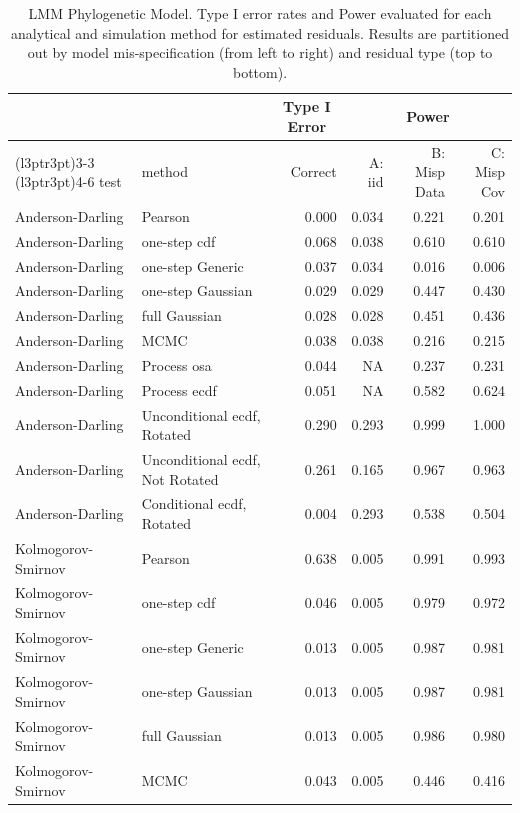 \documentclass[
]{article}
\begin{document}
\begin{table}[H]
\centering
\caption{\label{tab:phylo-results-lmm-est}LMM Phylogenetic Model. Type I error rates and Power evaluated for each analytical and simulation method for estimated residuals. Results are partitioned out by model mis-specification (from left to right) and residual type (top to bottom).}
\centering
\begin{tabular}[t]{llrrrr}
\toprule
\multicolumn{1}{c}{ } & \multicolumn{1}{c}{ } & \multicolumn{1}{c}{Type I Error} & \multicolumn{3}{c}{Power} \\
\cmidrule(l{3pt}r{3pt}){3-3} \cmidrule(l{3pt}r{3pt}){4-6}
test & method & Correct & A: iid & B: Misp Data & C: Misp Cov\\
\midrule
Anderson-Darling & Pearson & 0.000 & 0.034 & 0.221 & 0.201\\
Anderson-Darling & one-step cdf & 0.068 & 0.038 & 0.610 & 0.610\\
Anderson-Darling & one-step Generic & 0.037 & 0.034 & 0.016 & 0.006\\
Anderson-Darling & one-step Gaussian & 0.029 & 0.029 & 0.447 & 0.430\\
Anderson-Darling & full Gaussian & 0.028 & 0.028 & 0.451 & 0.436\\
\addlinespace
Anderson-Darling & MCMC & 0.038 & 0.038 & 0.216 & 0.215\\
Anderson-Darling & Process osa & 0.044 & NA & 0.237 & 0.231\\
Anderson-Darling & Process ecdf & 0.051 & NA & 0.582 & 0.624\\
Anderson-Darling & Unconditional ecdf, Rotated & 0.290 & 0.293 & 0.999 & 1.000\\
Anderson-Darling & Unconditional ecdf, Not Rotated & 0.261 & 0.165 & 0.967 & 0.963\\
\addlinespace
Anderson-Darling & Conditional ecdf, Rotated & 0.004 & 0.293 & 0.538 & 0.504\\
Kolmogorov- Smirnov & Pearson & 0.638 & 0.005 & 0.991 & 0.993\\
Kolmogorov- Smirnov & one-step cdf & 0.046 & 0.005 & 0.979 & 0.972\\
Kolmogorov- Smirnov & one-step Generic & 0.013 & 0.005 & 0.987 & 0.981\\
Kolmogorov- Smirnov & one-step Gaussian & 0.013 & 0.005 & 0.987 & 0.981\\
\addlinespace
Kolmogorov- Smirnov & full Gaussian & 0.013 & 0.005 & 0.986 & 0.980\\
Kolmogorov- Smirnov & MCMC & 0.043 & 0.005 & 0.446 & 0.416\\

\end{tabular}
\end{table}
\end{document}
